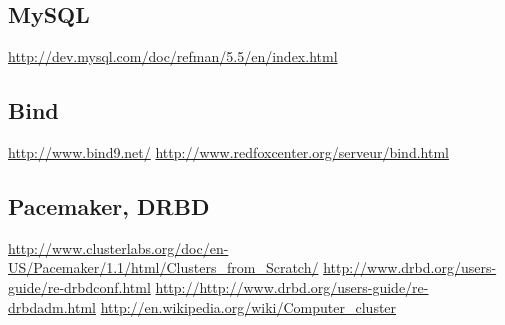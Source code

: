 \documentclass[11pt,a4paper]{report}
\begin{document}
            \subsection{MySQL}
            
                \url{http://dev.mysql.com/doc/refman/5.5/en/index.html}
                \url{}
                
            \subsection{Bind}
                
                \url{http://www.bind9.net/}
                \url{http://www.redfoxcenter.org/serveur/bind.html}
            
            \subsection{Pacemaker, DRBD}
                
                \url{http://www.clusterlabs.org/doc/en-US/Pacemaker/1.1/html/Clusters_from_Scratch/}
                \url{http://www.drbd.org/users-guide/re-drbdconf.html}
                \url{http://http://www.drbd.org/users-guide/re-drbdadm.html}
                \url{http://en.wikipedia.org/wiki/Computer_cluster}
                
\end{document}
